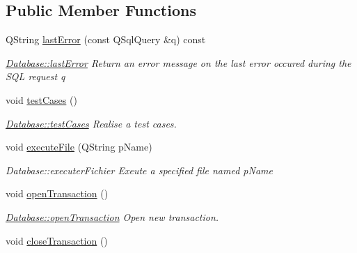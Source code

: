 \subsection*{Public Member Functions}
\begin{DoxyCompactItemize}
\item 
Q\-String \hyperlink{classDatabases_1_1Database_a00fcd95238619a41f7a734deaef3ea9f}{last\-Error} (const Q\-Sql\-Query \&q) const 
\begin{DoxyCompactList}\small\item\em \hyperlink{classDatabases_1_1Database_a00fcd95238619a41f7a734deaef3ea9f}{Database\-::last\-Error} Return an error message on the last error occured during the S\-Q\-L request {\itshape q} \end{DoxyCompactList}\item 
\hypertarget{classDatabases_1_1Database_a5029595698d889af5089428071c6ecda}{void \hyperlink{classDatabases_1_1Database_a5029595698d889af5089428071c6ecda}{test\-Cases} ()}\label{classDatabases_1_1Database_a5029595698d889af5089428071c6ecda}

\begin{DoxyCompactList}\small\item\em \hyperlink{classDatabases_1_1Database_a5029595698d889af5089428071c6ecda}{Database\-::test\-Cases} Realise a test cases. \end{DoxyCompactList}\item 
void \hyperlink{classDatabases_1_1Database_a21f6c86f95b149ac7dbf0ffc94021a93}{execute\-File} (Q\-String p\-Name)
\begin{DoxyCompactList}\small\item\em Database\-::executer\-Fichier Exeute a specified file named {\itshape p\-Name} \end{DoxyCompactList}\item 
\hypertarget{classDatabases_1_1Database_a64d55cd9452bbf2a6fd1693df004de59}{void \hyperlink{classDatabases_1_1Database_a64d55cd9452bbf2a6fd1693df004de59}{open\-Transaction} ()}\label{classDatabases_1_1Database_a64d55cd9452bbf2a6fd1693df004de59}

\begin{DoxyCompactList}\small\item\em \hyperlink{classDatabases_1_1Database_a64d55cd9452bbf2a6fd1693df004de59}{Database\-::open\-Transaction} Open new transaction. \end{DoxyCompactList}\item 
\hypertarget{classDatabases_1_1Database_a56faa5446bd58e6b3c3a4c503d9309b1}{void \hyperlink{classDatabases_1_1Database_a56faa5446bd58e6b3c3a4c503d9309b1}{close\-Transaction} ()}\label{classDatabases_1_1Database_a56faa5446bd58e6b3c3a4c503d9309b1}


\end{DoxyCompactItemize}
